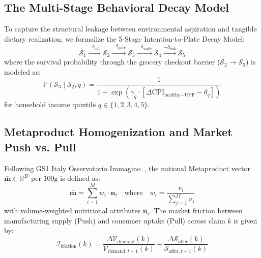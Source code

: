 \documentclass[journal,10pt,twocolumn]{article}
\begin{document}
\subsection{The Multi-Stage Behavioral Decay Model}
To capture the structural leakage between environmental aspiration and tangible dietary realization, we formalize the 5-Stage Intention-to-Plate Decay Model:
\begin{equation}
\mathcal{S}_1 \xrightarrow{-\delta_{\text{info}}} \mathcal{S}_2 \xrightarrow{-\delta_{\text{price}}} \mathcal{S}_3 \xrightarrow{-\delta_{\text{waste}}} \mathcal{S}_4 \xrightarrow{-\delta_{\text{leak}}} \mathcal{S}_5
\end{equation}
where the survival probability through the grocery checkout barrier ($\mathcal{S}_2 \to \mathcal{S}_3$) is modeled as:
\begin{equation}
\mathbb{P}(\mathcal{S}_3 \mid \mathcal{S}_2, q) = \frac{1}{1 + \exp\left( \gamma_q \cdot \left[ \Delta \text{CPI}_{\text{healthy}-\text{UPF}} - \theta_q \right] \right)}
\end{equation}
for household income quintile $q \in \{1, 2, 3, 4, 5\}$.

\subsection{Metaproduct Homogenization and Market Push vs. Pull}
Following GS1 Italy Osservatorio Immagino~\cite{gs1_immagino2026}, the national Metaproduct vector $\bar{\mathbf{m}} \in \mathbb{R}^D$ per $100\text{g}$ is defined as:
\begin{equation}
\bar{\mathbf{m}} = \sum_{i=1}^{M} w_i \cdot \mathbf{n}_i \quad \text{where} \quad w_i = \frac{v_i}{\sum_{j=1}^M v_j}
\end{equation}
with volume-weighted nutritional attributes $\mathbf{n}_i$. The market friction between manufacturing supply ($\text{Push}$) and consumer uptake ($\text{Pull}$) across claim $k$ is given by:
\begin{equation}
\mathcal{I}_{\text{friction}}(k) = \frac{\Delta \mathcal{V}_{\text{demand}}(k)}{\mathcal{V}_{\text{demand}, t-1}(k)} - \frac{\Delta \mathcal{S}_{\text{offer}}(k)}{\mathcal{S}_{\text{offer}, t-1}(k)}
\end{equation}
\end{document}
